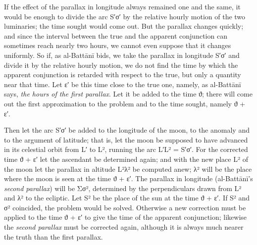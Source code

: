 \documentclass[11pt]{article}
\newcommand{\Pg}[1]{\marginpar{\footnotesize\color{gray}#1}}
\begin{document}
\par If the effect of the parallax in longitude always remained one and the same, it would be enough to divide the arc S′{\greekfont σ}′ by the relative hourly motion of the two luminaries; the time sought would come out. But the parallax changes quickly; and since the interval between the true and the apparent conjunction can sometimes reach nearly two hours, we cannot even suppose that it changes uniformly. So if, as al-Battānī bids, we take the parallax in longitude S′{\greekfont σ}′ and divide it by the relative hourly motion, we do not find the time by which the apparent conjunction is retarded with respect to the true, but only a quantity near that time. Let {\greekfont ε}′ be this time close to the true one, namely, as al-Battānī says, \emph{the hours of the first parallax}. Let it be added to the time {\greekfont ϑ}; there will come out the first approximation to the problem and to the time sought, namely {\greekfont ϑ} + {\greekfont ε}′.\par
\par \Pg{I 278}Then let the arc S′{\greekfont σ}′ be added to the longitude of the moon, to the anomaly and to the argument of latitude; that is, let the moon be supposed to have advanced in its celestial orbit from L′ to L², running the arc L′L² = S′{\greekfont σ}′. For the corrected time {\greekfont ϑ} + {\greekfont ε}′ let the ascendant be determined again; and with the new place L² of the moon let the parallax in altitude L²{\greekfont λ}² be computed anew; {\greekfont λ}² will be the place where the moon is seen at the time {\greekfont ϑ} + {\greekfont ε}′. The parallax in longitude (al-Battānī's \emph{second parallax}) will be {\greekfont Σσ}², determined by the perpendiculars drawn from L² and {\greekfont λ}² to the ecliptic. Let S² be the place of the sun at the time {\greekfont ϑ} + {\greekfont ε}′. If S² and {\greekfont σ}² coincided, the problem would be solved. Otherwise a new correction must be applied to the time {\greekfont ϑ} + {\greekfont ε}′ to give the time of the apparent conjunction; likewise the \emph{second parallax} must be corrected again, although it is always much nearer the truth than the first parallax.\par
\end{document}
